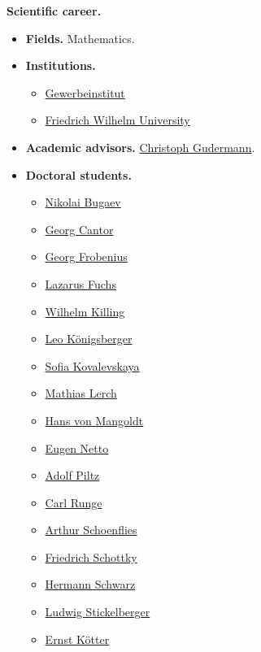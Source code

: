 \documentclass{article}
\begin{document}
\textbf{Scientific career.}
\begin{itemize}
	\item \textbf{Fields.} Mathematics.
	\item \textbf{Institutions.}
	\begin{itemize}
		\item \href{https://en.wikipedia.org/wiki/Technical_University_of_Berlin}{Gewerbeinstitut}
		\item \href{https://en.wikipedia.org/wiki/Humboldt_University_of_Berlin}{Friedrich Wilhelm University}
	\end{itemize}
	\item \textbf{Academic advisors.} \href{https://en.wikipedia.org/wiki/Christoph_Gudermann}{Christoph Gudermann}.
	\item \textbf{Doctoral students.}
	\begin{itemize}
		\item \href{https://en.wikipedia.org/wiki/Nikolai_Bugaev}{Nikolai Bugaev}
		\item \href{https://en.wikipedia.org/wiki/Georg_Cantor}{Georg Cantor}
		\item \href{https://en.wikipedia.org/wiki/Georg_Frobenius}{Georg Frobenius}
		\item \href{https://en.wikipedia.org/wiki/Lazarus_Fuchs}{Lazarus Fuchs}
		\item \href{https://en.wikipedia.org/wiki/Wilhelm_Killing}{Wilhelm Killing}
		\item \href{https://en.wikipedia.org/wiki/Leo_K%C3%B6nigsberger}{Leo Königsberger}
		\item \href{https://en.wikipedia.org/wiki/Sofia_Kovalevskaya}{Sofia Kovalevskaya}
		\item \href{https://en.wikipedia.org/wiki/Mathias_Lerch}{Mathias Lerch}
		\item \href{https://en.wikipedia.org/wiki/Hans_von_Mangoldt}{Hans von Mangoldt}
		\item \href{https://en.wikipedia.org/wiki/Eugen_Netto}{Eugen Netto}
		\item \href{https://en.wikipedia.org/wiki/Adolf_Piltz}{Adolf Piltz}
		\item \href{https://en.wikipedia.org/wiki/Carl_Runge}{Carl Runge}
		\item \href{https://en.wikipedia.org/wiki/Arthur_Schoenflies}{Arthur Schoenflies}
		\item \href{https://en.wikipedia.org/wiki/Friedrich_Schottky}{Friedrich Schottky}
		\item \href{https://en.wikipedia.org/wiki/Hermann_Schwarz}{Hermann Schwarz}
		\item \href{https://en.wikipedia.org/wiki/Ludwig_Stickelberger}{Ludwig Stickelberger}
		\item \href{https://en.wikipedia.org/wiki/Ernst_K%C3%B6tter}{Ernst Kötter}
	\end{itemize}
\end{itemize}
\end{document}
